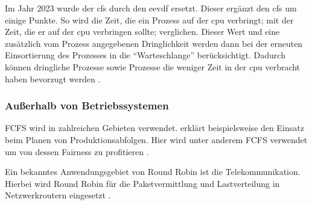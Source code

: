 Im Jahr 2023 wurde der \ac{cfs} durch den \ac{eevdf} ersetzt. Dieser ergänzt den \ac{cfs} um einige Punkte.
So wird die Zeit, die ein Prozess auf der \ac{cpu} verbringt; mit der Zeit, die er auf der \ac{cpu} verbringen sollte; verglichen. Dieser Wert und eine zusätzlich vom Prozess angegebenen Dringlichkeit werden dann bei der erneuten Einsortierung des Prozesses in die \enquote{Warteschlange} berücksichtigt.
Dadurch können dringliche Prozesse sowie Prozesse die weniger Zeit in der \ac{cpu} verbracht haben bevorzugt werden \autocite{Muller.01112023}.


\subsubsection{Außerhalb von Betriebssystemen}
\ac{FCFS} wird in zahlreichen Gebieten verwendet.  erklärt beispielsweise den Einsatz beim Planen von Produktionsabfolgen. Hier wird unter anderem \ac{FCFS} verwendet um von dessen Fairness zu profitieren \Autocite[S.735]{Groover.2016}.

Ein bekanntes Anwendungsgebiet von Round Robin ist die Telekommunikation. Hierbei wird Round Robin für die Paketvermittlung und Lastverteilung in Netzwerkroutern eingesetzt \Autocite[Kapitel 4.2.4]{Kurose.2010}.
